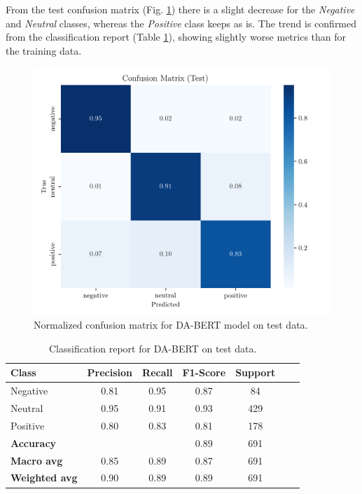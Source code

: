 \documentclass[conference]{IEEEtran}
\begin{document}
From the test confusion matrix (Fig. \ref{fig:dataaugmented_bert_confusion_matrix_Test}) there is a slight decrease for the \textit{Negative} and \textit{Neutral} classes, whereas the \textit{Positive} class keeps as is. The trend is confirmed from the classification report (Table \ref{cr_augmbert_test}), showing slightly worse metrics than for the training data.

\begin{figure}[H]
    \centering
    \includegraphics[width=1\linewidth]{assets/dataaugmented_bert_confusion_matrix_Test.png}
    \caption{Normalized confusion matrix for DA-BERT model on test data.}
    \label{fig:dataaugmented_bert_confusion_matrix_Test}
\end{figure}

\begin{table}[H]
\centering
\caption{Classification report for DA-BERT on test data.}
\label{cr_augmbert_test}
\begin{tabular}{lcccccc}
\toprule
\textbf{Class} & \textbf{Precision} & \textbf{Recall} & \textbf{F1-Score} & \textbf{Support} \\
\midrule
Negative & 0.81 & 0.95 & 0.87 & 84 \\
Neutral & 0.95 & 0.91 & 0.93 & 429 \\
Positive & 0.80 & 0.83 & 0.81 & 178 \\
\midrule
\textbf{Accuracy} &  &  & 0.89 & 691 \\
\textbf{Macro avg} & 0.85 & 0.89 & 0.87 & 691 \\
\textbf{Weighted avg} & 0.90 & 0.89 & 0.89 & 691 \\
\bottomrule
\end{tabular}
\end{table}
\end{document}
